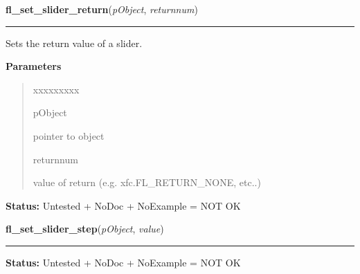 \hspace{.8\funcindent}\begin{boxedminipage}{\funcwidth}

    \raggedright \textbf{fl\_set\_slider\_return}(\textit{pObject}, \textit{returnnum})

    \vspace{-1.5ex}

    \rule{\textwidth}{0.5\fboxrule}
\setlength{\parskip}{2ex}
    Sets the return value of a slider.

\setlength{\parskip}{1ex}
      \textbf{Parameters}
      \vspace{-1ex}

      \begin{quote}
        \begin{Ventry}{xxxxxxxxx}

          \item[pObject]

          pointer to object

          \item[returnnum]

          value of return (e.g. xfc.FL\_RETURN\_NONE, etc..)

        \end{Ventry}

      \end{quote}

\textbf{Status:} Untested + NoDoc + NoExample = NOT OK



    \end{boxedminipage}

    \label{xformslib:library:fl_set_slider_step}

    \vspace{0.5ex}

\hspace{.8\funcindent}\begin{boxedminipage}{\funcwidth}

    \raggedright \textbf{fl\_set\_slider\_step}(\textit{pObject}, \textit{value})

    \vspace{-1.5ex}

    \rule{\textwidth}{0.5\fboxrule}
\setlength{\parskip}{2ex}
\setlength{\parskip}{1ex}
\textbf{Status:} Untested + NoDoc + NoExample = NOT OK



    \end{boxedminipage}

